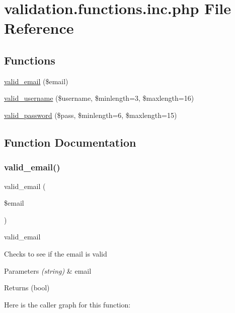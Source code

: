\hypertarget{validation_8functions_8inc_8php}{}\section{validation.\+functions.\+inc.\+php File Reference}
\label{validation_8functions_8inc_8php}
\subsection*{Functions}
\begin{DoxyCompactItemize}
\item 
\hyperlink{validation_8functions_8inc_8php_abe07a23d74d453da8fb639b5c3951873}{valid\+\_\+email} (\$email)
\item 
\hyperlink{validation_8functions_8inc_8php_adbefc0e701b0003953545b3fc3202417}{valid\+\_\+username} (\$username, \$minlength=3, \$maxlength=16)
\item 
\hyperlink{validation_8functions_8inc_8php_aa0f481fa4f084968dd99b3defeb6924b}{valid\+\_\+password} (\$pass, \$minlength=6, \$maxlength=15)
\end{DoxyCompactItemize}


\subsection{Function Documentation}
\mbox{\label{validation_8functions_8inc_8php_abe07a23d74d453da8fb639b5c3951873}} 
\subsubsection{\texorpdfstring{valid\+\_\+email()}{valid\_email()}}
{\footnotesize\ttfamily valid\+\_\+email (\begin{DoxyParamCaption}\item[{}]{\$email }\end{DoxyParamCaption})}

valid\+\_\+email

Checks to see if the email is valid


\begin{DoxyParams}{Parameters}
{\em (string)} & email \\
\hline
\end{DoxyParams}
\begin{DoxyReturn}{Returns}
(bool) 
\end{DoxyReturn}
Here is the caller graph for this function\+:
\mbox{\label{validation_8functions_8inc_8php_aa0f481fa4f084968dd99b3defeb6924b}} 
